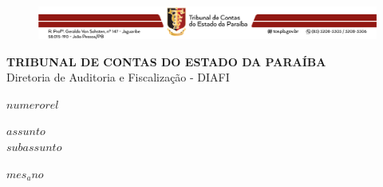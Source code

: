 \documentclass[$if(fontsize)$$fontsize$,$endif$$if(lang)$$lang$,$endif$$if(papersize)$$papersize$,$endif$$for(classoption)$$classoption$$sep$,$endfor$]{$documentclass$}
\begin{document}





\thispagestyle{plain}




\begin{figure}[t]
\includegraphics[scale=0.75]{barra_tce.png}
\centering
\end{figure}

\begin{center}
	{\Large \textbf{TRIBUNAL DE CONTAS DO ESTADO DA PARAÍBA}} \\
	{\large Diretoria de Auditoria e Fiscalização - DIAFI} \\
\end{center}

\thispagestyle{empty}

\vspace{4cm}

\begin{center}
{\Large \textbf{$numerorel$}}

\end{center}


\vspace{1cm}

\begin{center}
	{\Huge \textbf{$assunto$}} \\
	\vspace{0.5cm}
	{\Large $subassunto$}

\end{center}

\vspace{10cm}

\begin{center}
	$mes_ano$
\end{center}



\newpage

\thispagestyle{empty}


\end{document}
